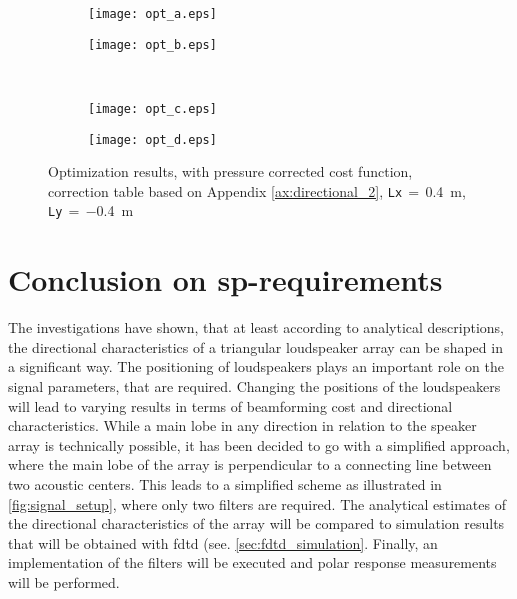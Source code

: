 \begin{figure}[H]
\begin{subfigure}[c]{0.5\textwidth}
\texttt{[image: opt\_a.eps]}
\label{fig:opt_res_a}
\end{subfigure}
\begin{subfigure}[c]{0.5\textwidth}
\texttt{[image: opt\_b.eps]}
\label{fig:opt_res_b}
\end{subfigure}\\
\hspace{0.1\textheight}
\begin{subfigure}[c]{0.5\textwidth}
\texttt{[image: opt\_c.eps]}
\label{fig:opt_res_c}
\end{subfigure}
\begin{subfigure}[c]{0.5\textwidth}
\texttt{[image: opt\_d.eps]}
\label{fig:opt_res_d}
\end{subfigure}
\caption{Optimization results, with pressure corrected cost function, correction table based on Appendix \ref{ax:directional_2}, \textcolor{green3}{\texttt{Lx}}\,$=$\,\SI{0.4}{\meter}, \textcolor{green3}{\texttt{Ly}}\,$=\,$\SI{-0.4}{\meter}}
		\label{fig:opt_res}
\end{figure}


\section{Conclusion on \gls{sp}-requirements}\label{sec:genetic_con}
The investigations have shown, that at least according to analytical descriptions, the directional characteristics of a triangular loudspeaker array can be shaped in a significant way. The positioning of loudspeakers plays an important role on the signal parameters, that are required. Changing the positions of the loudspeakers will lead to varying results in terms of beamforming cost and directional characteristics. While a main lobe in any direction in relation to the speaker array is technically possible, it has been decided to go with a simplified approach, where the main lobe of the array is perpendicular to a connecting line between two acoustic centers. This leads to a simplified scheme as illustrated in \autoref{fig:signal_setup}, where only two filters are required. The analytical estimates of the directional characteristics of the array will be compared to simulation results that will be obtained with \gls{fdtd} (see. \autoref{sec:fdtd_simulation}. Finally, an implementation of the filters will be executed and polar response measurements will be performed.